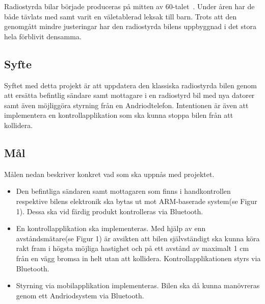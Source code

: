 \documentclass[a4paper]{article}
\begin{document}
Radiostyrda bilar började produceras på mitten av 60-talet~\cite{RCHistory}. Under åren har de både tävlats med samt varit en väletablerad leksak till barn. Trots att den genomgått mindre justeringar har den radiostyrda bilens uppbyggnad i det stora hela förblivit densamma.

\subsection{Syfte}

Syftet med detta projekt är att uppdatera den klassiska radiostyrda bilen genom att ersätta befintlig sändare samt mottagare i en radiostyrd bil med nya datorer samt även möjliggöra styrning från en Andriodtelefon. Intentionen är även att implementera en kontrollapplikation som ska kunna stoppa bilen från att kollidera.



\subsection{Mål}
Målen nedan beskriver konkret vad som ska uppnås med projektet.

\begin{itemize}
\item Den befintliga sändaren samt mottagaren som finns i handkontrollen respektive bilens elektronik ska bytas ut mot ARM-baserade system(se Figur 1). Dessa ska vid färdig produkt kontrolleras via Bluetooth.
\item En kontrollapplikation ska implementeras. Med hjälp av enn avståndsmätare(se Figur 1) är avsikten att bilen självständigt ska kunna köra rakt fram i högsta möjliga hastighet och på ett avstånd av maximalt 1 cm från en vägg bromsa in helt utan att kollidera. Kontrollapplikationen styrs via Bluetooth.
\item Styrning via mobilapplikation implementeras. Bilen ska då kunna manövreras genom ett Andriodsystem via Bluetooth.
\end{itemize}
\end{document}
